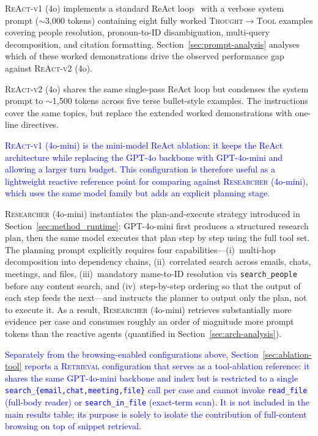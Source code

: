\textsc{ReAct-v1} (4o) implements a standard ReAct loop~\cite{yao2022react} with a verbose system prompt ($\sim$3{,}000 tokens) containing eight fully worked \textsc{Thought}$\to$\textsc{Tool} examples covering people resolution, pronoun-to-ID disambiguation, multi-query decomposition, and citation formatting. Section~\ref{sec:prompt-analysis} analyses which of these worked demonstrations drive the observed performance gap against \textsc{ReAct-v2} (4o).

\textsc{ReAct-v2} (4o) shares the same single-pass ReAct loop but condenses the system prompt to $\sim$1{,}500 tokens across five terse bullet-style examples. The instructions cover the same topics, but replace the extended worked demonstrations with one-line directives.

\textcolor{blue}{\textsc{ReAct-v1} (4o-mini) is the mini-model ReAct ablation: it keeps the ReAct architecture while replacing the GPT-4o backbone with GPT-4o-mini and allowing a larger turn budget. This configuration is therefore useful as a lightweight reactive reference point for comparing against \textsc{Researcher} (4o-mini), which uses the same model family but adds an explicit planning stage.}

\textsc{Researcher} (4o-mini) instantiates the plan-and-execute strategy introduced in Section~\ref{sec:method_runtime}: GPT-4o-mini first produces a structured research plan, then the same model executes that plan step by step using the full tool set. The planning prompt explicitly requires four capabilities---(i)~multi-hop decomposition into dependency chains, (ii)~correlated search across emails, chats, meetings, and files, (iii)~mandatory name-to-ID resolution via \texttt{search\_people} before any content search, and (iv)~step-by-step ordering so that the output of each step feeds the next---and instructs the planner to output only the plan, not to execute it. As a result, \textsc{Researcher} (4o-mini) retrieves substantially more evidence per case and consumes roughly an order of magnitude more prompt tokens than the reactive agents (quantified in Section~\ref{sec:arch-analysis}).

\textcolor{blue}{Separately from the browsing-enabled configurations above, Section~\ref{sec:ablation-tool} reports a \textsc{Retrieval} configuration that serves as a tool-ablation reference: it shares the same GPT-4o-mini backbone and index but is restricted to a single \texttt{search\_\{email,chat,meeting,file\}} call per case and cannot invoke \texttt{read\_file} (full-body reader) or \texttt{search\_in\_file} (exact-term scan). It is not included in the main results table; its purpose is solely to isolate the contribution of full-content browsing on top of snippet retrieval.}

